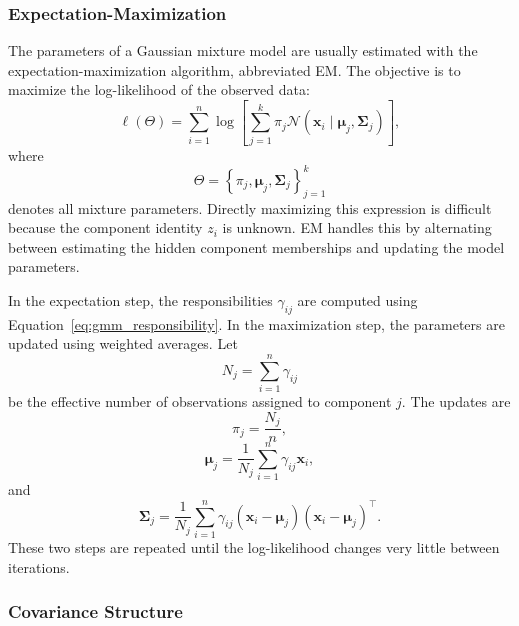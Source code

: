 \documentclass[12pt,letter]{article}
\begin{document}
\subsubsection{Expectation-Maximization}

The parameters of a Gaussian mixture model are usually estimated with the expectation-maximization algorithm, abbreviated EM. The objective is to maximize the log-likelihood of the observed data:
\begin{equation}
    \ell(\Theta)
    =
    \sum_{i=1}^{n}
    \log
    \left[
        \sum_{j=1}^{k}
        \pi_j
        \mathcal{N}
        \left(
            \mathbf{x}_i
            \mid
            \boldsymbol{\mu}_j,
            \boldsymbol{\Sigma}_j
        \right)
    \right],
\end{equation}
where
\begin{equation}
    \Theta
    =
    \left\{
        \pi_j,
        \boldsymbol{\mu}_j,
        \boldsymbol{\Sigma}_j
    \right\}_{j=1}^{k}
\end{equation}
denotes all mixture parameters. Directly maximizing this expression is difficult because the component identity \(z_i\) is unknown. EM handles this by alternating between estimating the hidden component memberships and updating the model parameters.

In the expectation step, the responsibilities \(\gamma_{ij}\) are computed using Equation~\ref{eq:gmm_responsibility}. In the maximization step, the parameters are updated using weighted averages. Let
\begin{equation}
    N_j=\sum_{i=1}^{n}\gamma_{ij}
\end{equation}
be the effective number of observations assigned to component \(j\). The updates are
\begin{equation}
    \pi_j = \frac{N_j}{n},
\end{equation}
\begin{equation}
    \boldsymbol{\mu}_j
    =
    \frac{1}{N_j}
    \sum_{i=1}^{n}
    \gamma_{ij}\mathbf{x}_i,
\end{equation}
and
\begin{equation}
    \boldsymbol{\Sigma}_j
    =
    \frac{1}{N_j}
    \sum_{i=1}^{n}
    \gamma_{ij}
    \left(\mathbf{x}_i-\boldsymbol{\mu}_j\right)
    \left(\mathbf{x}_i-\boldsymbol{\mu}_j\right)^\top.
\end{equation}
These two steps are repeated until the log-likelihood changes very little between iterations.

\subsubsection{Covariance Structure}
\end{document}
